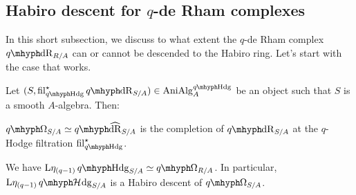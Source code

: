 \documentclass[DIV=12,numbers=enddot,leqno,bibliography=totoc]{scrartcl}
\begin{document}
	\subsection{Habiro descent for \texorpdfstring{$q$}{q}-de Rham complexes}\label{subsec:qdeRhamHabiroDescent}
	
	In this short subsection, we discuss to what extent the $q$-de Rham complex $\qdeRham_{R/A}$ can or cannot be descended to the Habiro ring. Let's start with the case that works.
	\begin{prop}\label{prop:Letaq-1}
		Let $(S, \fil_{\qHodge}^\star\qdeRham_{S/A})\in \cat{AniAlg}_A^{\qHodge}$ be an object such that $S$ is a smooth $A$-algebra. Then:
		\begin{alphanumerate}
			\item $\qOmega_{S/A}\simeq \qhatdeRham_{S/A}$ is the completion of $\qdeRham_{S/A}$ at the $q$-Hodge filtration $ \fil_{\qHodge}^\star$.\label{enum:qHodgeCompletion}
			\item We have $\L\eta_{(q-1)}\qHodge_{S/A}\simeq \qOmega_{R/A}$. In particular, $\L\eta_{(q-1)}\qHhodge_{S/A}$ is a Habiro descent of $\qOmega_{S/A}$.\label{enum:Letaq-1}
		\end{alphanumerate}
	\end{prop}
\end{document}
